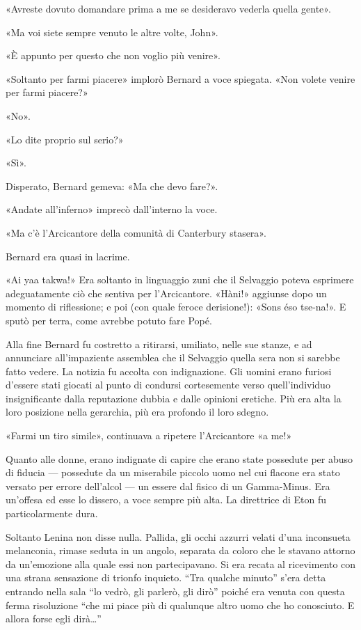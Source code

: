 \documentclass[
a5paper, %
10pt, %
twoside, 
onecolumn, %
openany, %
]{memoir}
\begin{document}
«Avreste dovuto domandare prima a me se desideravo vederla quella gente».

«Ma voi siete sempre venuto le altre volte, John».

«È appunto per questo che non voglio più venire».

«Soltanto per farmi piacere» implorò Bernard a voce spiegata. «Non volete venire per farmi piacere?»

«No».

«Lo dite proprio sul serio?»

«Sì».

Disperato, Bernard gemeva: «Ma che devo fare?».

«Andate all’inferno» imprecò dall’interno la voce.

«Ma c’è l’Arcicantore della comunità di Canterbury stasera».

Bernard era quasi in lacrime.

«Ai yaa takwa!» Era soltanto in linguaggio zuni che il Selvaggio poteva esprimere adeguatamente ciò che sentiva per l’Arcicantore. «Hàni!» aggiunse dopo un momento di riflessione; e poi (con quale feroce derisione!): «Sons éso tse-na!». E sputò per terra, come avrebbe potuto fare Popé.

Alla fine Bernard fu costretto a ritirarsi, umiliato, nelle sue stanze, e ad annunciare all’impaziente assemblea che il Selvaggio quella sera non si sarebbe fatto vedere. La notizia fu accolta con indignazione. Gli uomini erano furiosi d’essere stati giocati al punto di condursi cortesemente verso quell’individuo insignificante dalla reputazione dubbia e dalle opinioni eretiche. Più era alta la loro posizione nella gerarchia, più era profondo il loro sdegno.

«Farmi un tiro simile», continuava a ripetere l’Arcicantore «a me!»

Quanto alle donne, erano indignate di capire che erano state possedute per abuso di fiducia — possedute da un miserabile piccolo uomo nel cui flacone era stato versato per errore dell’alcol — un essere dal fisico di un Gamma-Minus. Era un’offesa ed esse lo dissero, a voce sempre più alta. La direttrice di Eton fu particolarmente dura.

Soltanto Lenina non disse nulla. Pallida, gli occhi azzurri velati d’una inconsueta melanconia, rimase seduta in un angolo, separata da coloro che le stavano attorno da un’emozione alla quale essi non partecipavano. Si era recata al ricevimento con una strana sensazione di trionfo inquieto. “Tra qualche minuto” s’era detta entrando nella sala “lo vedrò, gli parlerò, gli dirò” poiché era venuta con questa ferma risoluzione “che mi piace più di qualunque altro uomo che ho conosciuto. E allora forse egli dirà…”
\end{document}
